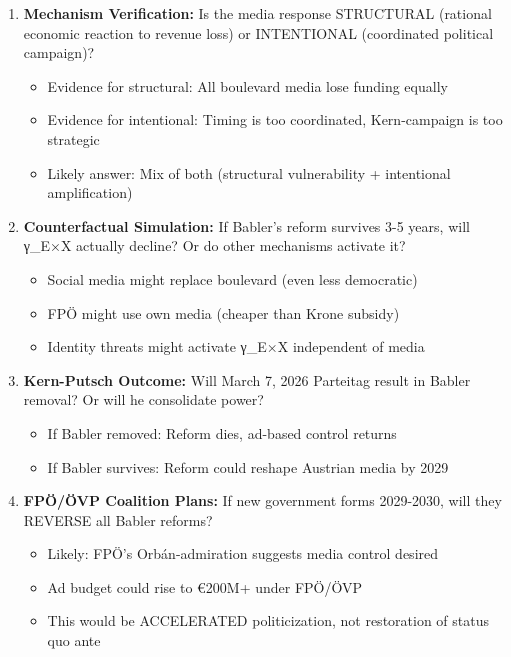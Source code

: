 \begin{enumerate}
\item \textbf{Mechanism Verification:} Is the media response STRUCTURAL (rational
  economic reaction to revenue loss) or INTENTIONAL (coordinated political campaign)?
  \begin{itemize}
  \item Evidence for structural: All boulevard media lose funding equally
  \item Evidence for intentional: Timing is too coordinated, Kern-campaign is too strategic
  \item Likely answer: Mix of both (structural vulnerability + intentional amplification)
  \end{itemize}

\item \textbf{Counterfactual Simulation:} If Babler's reform survives 3-5 years,
  will γ_{E×X} actually decline? Or do other mechanisms activate it?
  \begin{itemize}
  \item Social media might replace boulevard (even less democratic)
  \item FPÖ might use own media (cheaper than Krone subsidy)
  \item Identity threats might activate γ_{E×X} independent of media
  \end{itemize}

\item \textbf{Kern-Putsch Outcome:} Will March 7, 2026 Parteitag result in
  Babler removal? Or will he consolidate power?
  \begin{itemize}
  \item If Babler removed: Reform dies, ad-based control returns
  \item If Babler survives: Reform could reshape Austrian media by 2029
  \end{itemize}

\item \textbf{FPÖ/ÖVP Coalition Plans:} If new government forms 2029-2030, will
  they REVERSE all Babler reforms?
  \begin{itemize}
  \item Likely: FPÖ's Orbán-admiration suggests media control desired
  \item Ad budget could rise to €200M+ under FPÖ/ÖVP
  \item This would be ACCELERATED politicization, not restoration of status quo ante
  \end{itemize}
\end{enumerate}

